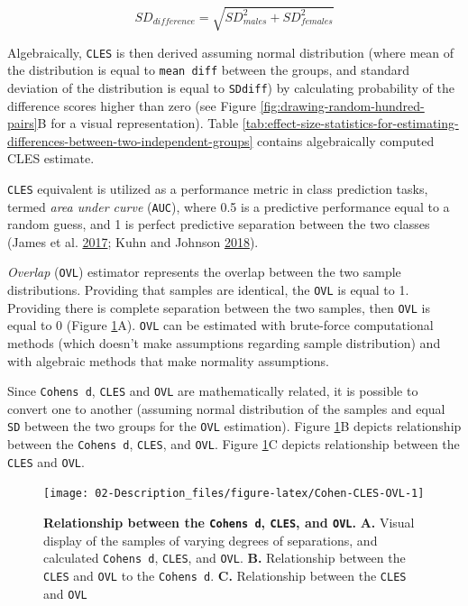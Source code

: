 \documentclass[
]{book}
\begin{document}
\begin{equation}
  SD_{difference} = \sqrt{SD_{males}^{2} + SD_{females}^{2}}
  \label{eq:sd-diff}
\end{equation}

Algebraically, \texttt{CLES} is then derived assuming normal distribution (where mean of the distribution is equal to \texttt{mean\ diff} between the groups, and standard deviation of the distribution is equal to \texttt{SDdiff}) by calculating probability of the difference scores higher than zero (see Figure \ref{fig:drawing-random-hundred-pairs}B for a visual representation). Table \ref{tab:effect-size-statistics-for-estimating-differences-between-two-independent-groups} contains algebraically computed CLES estimate.

\texttt{CLES} equivalent is utilized as a performance metric in class prediction tasks, termed \emph{area under curve} (\texttt{AUC}), where 0.5 is a predictive performance equal to a random guess, and 1 is perfect predictive separation between the two classes (James et al. \protect\hyperlink{ref-jamesIntroductionStatisticalLearning2017}{2017}; Kuhn and Johnson \protect\hyperlink{ref-kuhnAppliedPredictiveModeling2018}{2018}).

\emph{Overlap} (\texttt{OVL}) estimator represents the overlap between the two sample distributions. Providing that samples are identical, the \texttt{OVL} is equal to 1. Providing there is complete separation between the two samples, then \texttt{OVL} is equal to 0 (Figure \ref{fig:Cohen-CLES-OVL}A). \texttt{OVL} can be estimated with brute-force computational methods (which doesn't make assumptions regarding sample distribution) and with algebraic methods that make normality assumptions.

Since \texttt{Cohen\textquotesingle{}s\ d}, \texttt{CLES} and \texttt{OVL} are mathematically related, it is possible to convert one to another (assuming normal distribution of the samples and equal \texttt{SD} between the two groups for the \texttt{OVL} estimation). Figure \ref{fig:Cohen-CLES-OVL}B depicts relationship between the \texttt{Cohen\textquotesingle{}s\ d}, \texttt{CLES}, and \texttt{OVL}. Figure \ref{fig:Cohen-CLES-OVL}C depicts relationship between the \texttt{CLES} and \texttt{OVL}.

\begin{figure}

{\centering \texttt{[image: 02-Description\_files/figure-latex/Cohen-CLES-OVL-1]} 

}

\caption{\textbf{Relationship between the \texttt{Cohen\textquotesingle{}s\ d}, \texttt{CLES}, and \texttt{OVL}.} \textbf{A.} Visual display of the samples of varying degrees of separations, and calculated \texttt{Cohen\textquotesingle{}s\ d}, \texttt{CLES}, and \texttt{OVL}. \textbf{B.} Relationship between the \texttt{CLES} and \texttt{OVL} to the \texttt{Cohen\textquotesingle{}s\ d}. \textbf{C.} Relationship between the \texttt{CLES} and \texttt{OVL}}\label{fig:Cohen-CLES-OVL}
\end{figure}
\end{document}
